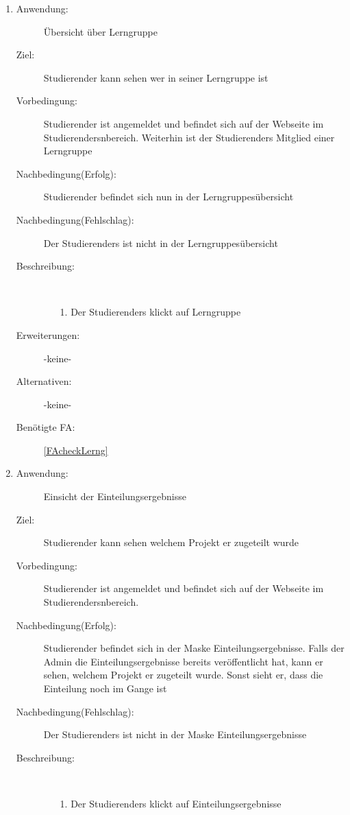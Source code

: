 \documentclass[parskip=full]{scrartcl}
\newcommand{\swtLabel}[1]{\textbf{/#1\arabic*0/}}
\begin{document}
\begin{enumerate}[label=\swtLabel{S}]
   \item \label{UCstudUebersichtLernG}
  \begin{description}
  \item[Anwendung:] Übersicht über \gls{Lerngruppe}
  \item[Ziel:] \gls{Studierender} kann sehen wer in seiner \gls{Lerngruppe} ist
  	\item[Vorbedingung:] \gls{Studierender} ist angemeldet und befindet sich auf der
  	Webseite im \glspl{Studierender}nbereich. Weiterhin ist der \glspl{Studierender} Mitglied einer
  	\gls{Lerngruppe}
  	\item[Nachbedingung(Erfolg):] \gls{Studierender} befindet sich nun in der
  	\glspl{Lerngruppe}übersicht
  	\item[Nachbedingung(Fehlschlag):] Der \glspl{Studierender} ist nicht in der
  	\glspl{Lerngruppe}übersicht
  	\item[Beschreibung:]~
  	\begin{enumerate}
  	  \item[1.] Der \glspl{Studierender} klickt auf \gls{Lerngruppe} %
    \end{enumerate}
  	\item[Erweiterungen:] -keine-
  	\item[Alternativen:] -keine-  	
  	\item[Benötigte FA:] \ref{FAcheckLerng}
  \end{description}
  
     \item \label{UCstudEinsichtEinteilung}
  \begin{description}
  \item[Anwendung:] Einsicht der \gls{Einteilung}sergebnisse
  \item[Ziel:] \gls{Studierender} kann sehen welchem \gls{Projekt} er
  zugeteilt wurde
  	\item[Vorbedingung:] \gls{Studierender} ist angemeldet und befindet sich auf der
  	Webseite im \glspl{Studierender}nbereich. 
  	\item[Nachbedingung(Erfolg):] \gls{Studierender} befindet sich in der Maske
  	\gls{Einteilung}sergebnisse. %
  	Falls der \gls{Admin} die \gls{Einteilung}sergebnisse bereits veröffentlicht hat,
  	kann er sehen, welchem \gls{Projekt} er zugeteilt wurde. Sonst sieht er, dass
  	die \gls{Einteilung} noch im Gange ist %
  	\item[Nachbedingung(Fehlschlag):] Der \glspl{Studierender} ist nicht in der
  	Maske \gls{Einteilung}sergebnisse
  	\item[Beschreibung:]~
  	\begin{enumerate}
  	  \item[1.] Der \glspl{Studierender} klickt auf \gls{Einteilung}sergebnisse
 

\end{enumerate}
\end{description}
\end{enumerate}
\end{document}
